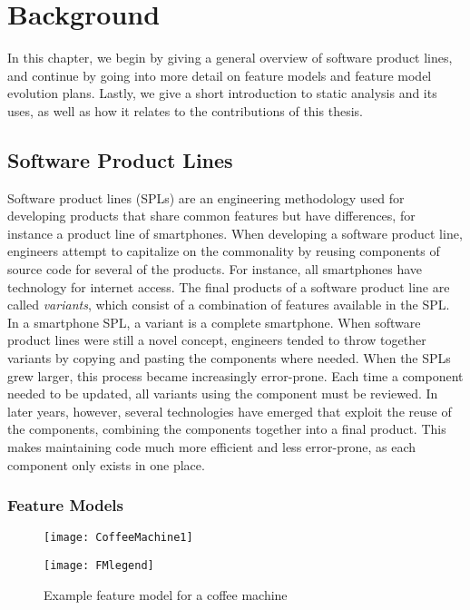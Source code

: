 \chapter{Background} 
\label{cha:background}

In this chapter, we begin by giving a general overview of software product lines, and continue by going into more detail on feature models and feature model evolution plans. Lastly, we give a short introduction to static analysis and its uses, as well as how it relates to the contributions of this thesis.

\section{Software Product Lines}
\label{sec:software-product-lines}

Software product lines (SPLs) are an engineering methodology used for developing products that share common features but have differences, for instance a product line of smartphones. When developing a software product line, engineers attempt to capitalize on the commonality by reusing components of source code for several of the products. For instance, all smartphones have technology for internet access. The final products of a software product line are called \emph{variants}, which consist of a combination of features available in the SPL. In a smartphone SPL, a variant is a complete smartphone. When software product lines were still a novel concept, engineers tended to throw together variants by copying and pasting the components where needed. When the SPLs grew larger, this process became increasingly error-prone. Each time a component needed to be updated, all variants using the component must be reviewed. In later years, however, several technologies have emerged that exploit the reuse of the components, combining the components together into a final product. This makes maintaining code  much more efficient and less error-prone, as each component only exists in one place.~\cite{book:introduction-to-spl}


\subsection{Feature Models}
\label{sub:feature-models}

\begin{figure}
   \begin{center}
      \texttt{[image: CoffeeMachine1]}
   \end{center}
   \hspace{25mm} \texttt{[image: FMlegend]}
   \caption[Example feature model for a coffee machine]{Example feature model for a coffee machine \protect\footnotemark}
   \label{ex:fm-coffee1}
\end{figure}

